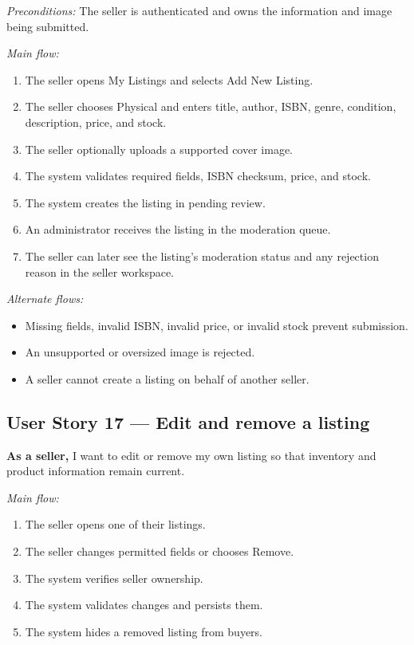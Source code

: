 \documentclass[11pt]{scrreprt}
\begin{document}
\textit{Preconditions:} The seller is authenticated and owns the information
and image being submitted.

\textit{Main flow:}
\begin{enumerate}
\item The seller opens My Listings and selects Add New Listing.
\item The seller chooses Physical and enters title, author, ISBN, genre,
condition, description, price, and stock.
\item The seller optionally uploads a supported cover image.
\item The system validates required fields, ISBN checksum, price, and stock.
\item The system creates the listing in pending review.
\item An administrator receives the listing in the moderation queue.
\item The seller can later see the listing's moderation status and any
rejection reason in the seller workspace.
\end{enumerate}

\textit{Alternate flows:}
\begin{itemize}
\item Missing fields, invalid ISBN, invalid price, or invalid stock prevent
submission.
\item An unsupported or oversized image is rejected.
\item A seller cannot create a listing on behalf of another seller.
\end{itemize}

\subsection{User Story 17 --- Edit and remove a listing}
\textbf{As a seller,} I want to edit or remove my own listing so that inventory
and product information remain current.

\textit{Main flow:}
\begin{enumerate}
\item The seller opens one of their listings.
\item The seller changes permitted fields or chooses Remove.
\item The system verifies seller ownership.
\item The system validates changes and persists them.
\item The system hides a removed listing from buyers.
\end{enumerate}
\end{document}
